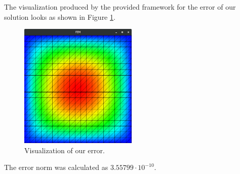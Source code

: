 \documentclass[11pt]{article}
\begin{document}
    The visualization produced by the provided framework for the error of our solution looks as shown in Figure \ref{fig:error}.

    \begin{figure}[H]
        \centering
        \includegraphics[width=0.5\textwidth]{error}
        \caption{Visualization of our error.}
        \label{fig:error}
    \end{figure}

    The error norm was calculated as $3.55799 \cdot 10^{-10}$.
\end{document}
